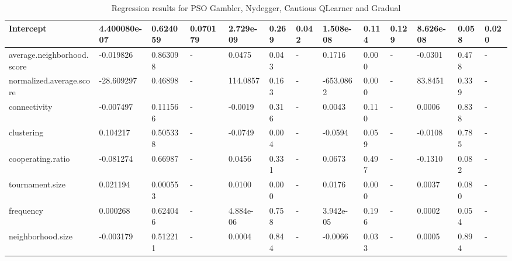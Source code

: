 \begin{table}[!hbtp]
\begin{adjustbox}{width=1\textwidth, height=0.2\textwidth}
\begin{tabular}{|l|l|l|l|l|l|l|l|l|l|l|l|l|}
			Intercept                  & 4.400080e-07 & 0.624059    & 0.070179      & 2.729e-09   & 0.269       & 0.042         & 1.508e-08   & 0.114       & 0.129         & 8.626e-08       & 0.058       & 0.020         \\ \hline
			average.neighborhood.score & -0.019826    & 0.863098    & -             & 0.0475      & 0.043       & -             & 0.1716      & 0.000       & -             & -0.0301         & 0.478       & -             \\ \hline
			normalized.average.score   & -28.609297   & 0.46898     & -             & 114.0857    & 0.163       & -             & -653.0862   & 0.000       & -             & 83.8451         & 0.339       & -             \\ \hline
			connectivity               & -0.007497    & 0.111566    & -             & -0.0019     & 0.316       & -             & 0.0043      & 0.110       & -             & 0.0006          & 0.838       & -             \\ \hline
			clustering                 & 0.104217     & 0.505338    & -             & -0.0749     & 0.004       & -             & -0.0594     & 0.059       & -             & -0.0108         & 0.785       & -             \\ \hline
			cooperating.ratio          & -0.081274    & 0.66987     & -             & 0.0456      & 0.331       & -             & 0.0673      & 0.497       & -             & -0.1310         & 0.082       & -             \\ \hline
			tournament.size            & 0.021194     & 0.000553    & -             & 0.0100      & 0.000       & -             & 0.0176      & 0.000       & -             & 0.0037          & 0.080       & -             \\ \hline
			frequency                  & 0.000268     & 0.624046    & -             & 4.884e-06   & 0.758       & -             & 3.942e-05   & 0.196       & -             & 0.0002          & 0.054       & -             \\ \hline
			neighborhood.size          & -0.003179    & 0.512211    & -             & 0.0004      & 0.844       & -             & -0.0066     & 0.033       & -             & 0.0005          & 0.894       & -             \\ \bottomrule

		\end{tabular}
	\end{adjustbox}
	\caption{Regression results for PSO Gambler, Nydegger, Cautious QLearner and Gradual}
	\label{reg-for-top}
\end{table}

